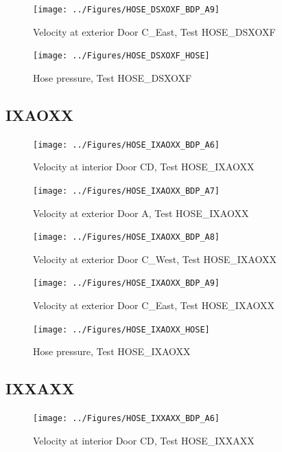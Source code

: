 \documentclass[11pt,oneside]{book}
\begin{document}
\begin{figure}[!ht]
\texttt{[image: ../Figures/HOSE\_DSXOXF\_BDP\_A9]}
\caption{Velocity at exterior Door C\_East, Test HOSE\_DSXOXF}
\label{fig:HOSE_DSXOXF_BDP_A9}
\end{figure}

\begin{figure}[!ht]
\texttt{[image: ../Figures/HOSE\_DSXOXF\_HOSE]}
\caption{Hose pressure, Test HOSE\_DSXOXF}
\label{fig:HOSE_DSXOXF_HOSE}
\end{figure}


\clearpage


\subsection{IXAOXX}

\begin{figure}[!ht]
\texttt{[image: ../Figures/HOSE\_IXAOXX\_BDP\_A6]}
\caption{Velocity at interior Door CD, Test HOSE\_IXAOXX}
\label{fig:HOSE_IXAOXX_BDP_A6}
\end{figure}

\begin{figure}[!ht]
\texttt{[image: ../Figures/HOSE\_IXAOXX\_BDP\_A7]}
\caption{Velocity at exterior Door A, Test HOSE\_IXAOXX}
\label{fig:HOSE_IXAOXX_BDP_A7}
\end{figure}

\begin{figure}[!ht]
\texttt{[image: ../Figures/HOSE\_IXAOXX\_BDP\_A8]}
\caption{Velocity at exterior Door C\_West, Test HOSE\_IXAOXX}
\label{fig:HOSE_IXAOXX_BDP_A8}
\end{figure}

\begin{figure}[!ht]
\texttt{[image: ../Figures/HOSE\_IXAOXX\_BDP\_A9]}
\caption{Velocity at exterior Door C\_East, Test HOSE\_IXAOXX}
\label{fig:HOSE_IXAOXX_BDP_A9}
\end{figure}

\begin{figure}[!ht]
\texttt{[image: ../Figures/HOSE\_IXAOXX\_HOSE]}
\caption{Hose pressure, Test HOSE\_IXAOXX}
\label{fig:HOSE_IXAOXX_HOSE}
\end{figure}


\clearpage


\subsection{IXXAXX}

\begin{figure}[!ht]
\texttt{[image: ../Figures/HOSE\_IXXAXX\_BDP\_A6]}
\caption{Velocity at interior Door CD, Test HOSE\_IXXAXX}
\label{fig:HOSE_IXXAXX_BDP_A6}
\end{figure}
\end{document}
